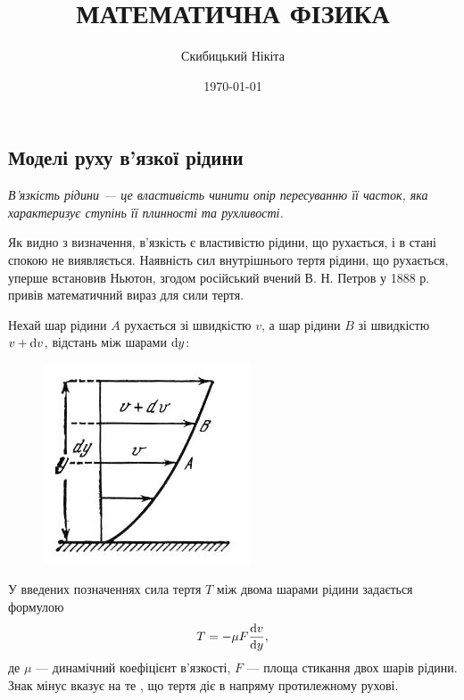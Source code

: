 

\title{{\Huge МАТЕМАТИЧНА ФІЗИКА}}
\author{Скибицький Нікіта}
\date{\today}





\tableofcontents

\setcounter{section}{3}
\setcounter{subsection}{3}
\setcounter{subsubsection}{13}
\setcounter{theorem}{19}
\setcounter{equation}{107}

\subsection{Моделі руху в'язкої рідини}

\begin{definition}
	\it{В'язкість рідини} --- це властивість чинити опір пересуванню її часток, яка характеризує ступінь її плинності та рухливості.
\end{definition}

Як видно з визначення, в'язкість є властивістю рідини, що рухається, і в стані спокою не виявляється. Наявність сил внутрішнього тертя рідини, що рухається, уперше встановив Ньютон, згодом російський вчений В. Н. Петров у 1888 р. привів математичний вираз для сили тертя. \medskip

Нехай шар рідини $A$ рухається зі швидкістю $v$, а шар рідини $B$ зі швидкістю $v + \mathop{}\!\mathrm{d} v$, відстань між шарами $\mathop{}\!\mathrm{d} y$:
\begin{figure}[H]
	\centering
	\includegraphics[]{img/12-1.png}
\end{figure}

У введених позначеннях сила тертя $T$ між двома шарами рідини задається формулою
\begin{equation}
	T = - \mu F\frac{\mathop{}\!\mathrm{d} v}{\mathop{}\!\mathrm{d} y},
\end{equation}
де $\mu$ --- динамічний коефіцієнт в'язкості, $F$ --- площа стикання двох шарів рідини. Знак мінус вказує на те , що тертя діє в напряму протилежному рухові. \medskip

